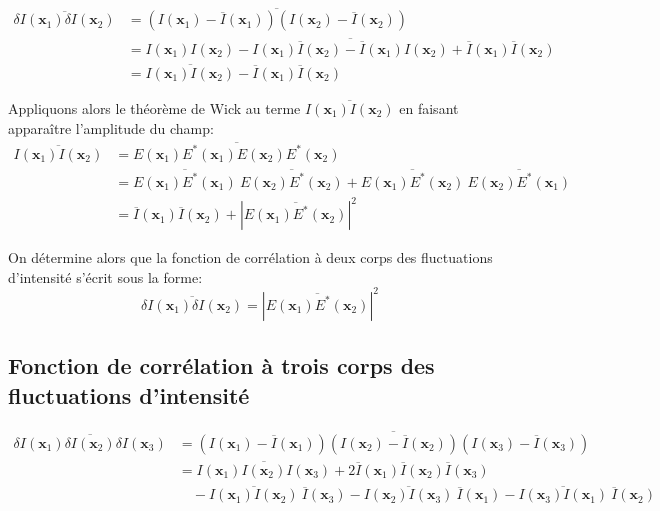 \begin{align}
\overline{\delta I (\mathbf{x}_1) \delta I(\mathbf{x}_2)} &= \overline{(I(\mathbf{x}_1)-\overline{I}(\mathbf{x}_1)) (I(\mathbf{x}_2)-\overline{I}(\mathbf{x}_2))} \\
&= \overline{I(\mathbf{x}_1)I(\mathbf{x}_2) - I(\mathbf{x}_1) \overline{I}(\mathbf{x}_2) - \overline{I}(\mathbf{x}_1) I(\mathbf{x}_2) + \overline{I}(\mathbf{x}_1) \overline{I}(\mathbf{x}_2)} \\
&=\overline{I(\mathbf{x}_1)I(\mathbf{x}_2)} - \overline{I}(\mathbf{x}_1) \overline{I}(\mathbf{x}_2)
\end{align}

Appliquons alors le théorème de Wick au terme $\overline{I(\mathbf{x}_1)I(\mathbf{x}_2)}$ en faisant apparaître l'amplitude du champ:
\begin{align}
\overline{I(\mathbf{x}_1)I(\mathbf{x}_2)} &= \overline{E(\mathbf{x}_1)E^*(\mathbf{x}_1)E(\mathbf{x}_2)E^*(\mathbf{x}_2)} \\
&= \overline{E(\mathbf{x}_1)E^*(\mathbf{x}_1)} \: \overline{E(\mathbf{x}_2)E^*(\mathbf{x}_2)} + \overline{E(\mathbf{x}_1)E^*(\mathbf{x}_2)} \: \overline{E(\mathbf{x}_2)E^*(\mathbf{x}_1)} \\
&= \overline{I}(\mathbf{x}_1) \overline{I}(\mathbf{x}_2) + \left| \overline{E(\mathbf{x}_1) E^*(\mathbf{x}_2)} \right|^2
\end{align}

On détermine alors que la fonction de corrélation à deux corps des fluctuations d'intensité s'écrit sous la forme:
\begin{equation}
\overline{\delta I(\mathbf{x}_1) \delta I(\mathbf{x}_2)} = \left| \overline{E(\mathbf{x}_1) E^*(\mathbf{x}_2)} \right|^2
\label{eq:theoreme_wick_2corps}
\end{equation}


\subsection{Fonction de corrélation à trois corps des fluctuations d'intensité}


\begin{align}
\overline{\delta I(\mathbf{x}_1) \delta I(\mathbf{x}_2) \delta I(\mathbf{x}_3)} &= \overline{(I(\mathbf{x}_1)-\overline{I}(\mathbf{x}_1))(I(\mathbf{x}_2)-\overline{I}(\mathbf{x}_2))(I(\mathbf{x}_3)-\overline{I}(\mathbf{x}_3))} \\
&= \overline{I(\mathbf{x}_1)I(\mathbf{x}_2)I(\mathbf{x}_3)} +2 \overline{I}(\mathbf{x}_1)\overline{I}(\mathbf{x}_2)\overline{I}(\mathbf{x}_3) \\
\nonumber & \quad - \overline{I(\mathbf{x}_1)I(\mathbf{x}_2)}\:\overline{I}(\mathbf{x}_3) - \overline{I(\mathbf{x}_2)I(\mathbf{x}_3)}\:\overline{I}(\mathbf{x}_1)- \overline{I(\mathbf{x}_3)I(\mathbf{x}_1)}\:\overline{I}(\mathbf{x}_2) 
\end{align}

